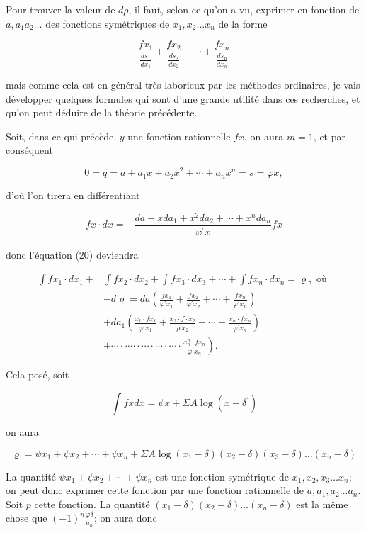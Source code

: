 \documentclass{article}
\begin{document}
Pour trouver la valeur de \(d \rho\), il faut, selon ce qu'on a vu, exprimer en fonction de \(a, a_{1} a_{2} \ldots\) des fonctions symétriques de \(x_{1}, x_{2} \ldots x_{n}\) de la forme

\[
\frac{f x_{1}}{\frac{d s_{1}}{d x_{1}}}+\frac{f x_{2}}{\frac{d s_{2}}{d x_{2}}}+\cdots+\frac{f x_{n}}{\frac{d s_{n}}{d x_{n}}}
\]

mais comme cela est en général très laborieux par les méthodes ordinaires, je vais développer quelques formules qui sont d'une grande utilité dans ces recherches, et qu'on peut déduire de la théorie précédente.

Soit, dans ce qui précède, \(y\) une fonction rationnelle \(f x\), on aura \(m=1\), et par conséquent

\[
0=q=a+a_{1} x+a_{2} x^{2}+\cdots+a_{n} x^{n}=s=\varphi x,
\]

d'où l'on tirera en différentiant

\[
f x \cdot d x=-\frac{d a+x d a_{1}+x^{2} d a_{2}+\cdots+x^{n} d a_{n}}{\varphi^{\prime} x} f x
\]

donc l'équation (20) deviendra

\[
\begin{aligned}
\int f x_{1} \cdot d x_{1}+ & \int f x_{2} \cdot d x_{2}+\int f x_{3} \cdot d x_{3}+\cdots+\int f x_{n} \cdot d x_{n}=\varrho, \text { où } \\
& -d \varrho=d a\left(\frac{f x_{1}}{\varphi^{\prime} x_{1}}+\frac{f x_{2}}{\varphi^{\prime} x_{2}}+\cdots+\frac{f x_{n}}{\varphi^{\prime} x_{n}}\right) \\
& +d a_{1}\left(\frac{x_{1} \cdot f x_{1}}{\varphi^{\prime} x_{1}}+\frac{x_{2} \cdot f \cdot x_{2}}{\rho^{\prime} x_{2}}+\cdots+\frac{x_{n} \cdot f x_{n}}{\varphi^{\prime} x_{n}}\right) \\
& \left.+\cdots \cdot \cdot \cdots \cdot \cdots \cdot \cdots \cdot \cdots \cdot \frac{x_{n}^{n} \cdot f x_{n}}{\varphi^{\prime} x_{n}}\right) .
\end{aligned}
\]

Cela posé, soit

\[
\int f x d x=\psi x+\Sigma A \log \left(x-\delta^{\prime}\right)
\]

on aura

\[
\varrho=\psi x_{1}+\psi x_{2}+\cdots+\psi x_{n}+\Sigma A \log \left(x_{1}-\delta\right)\left(x_{2}-\delta\right)\left(x_{3}-\delta\right) \ldots\left(x_{n}-\delta\right)
\]

La quantité \(\psi x_{1}+\psi x_{2}+\cdots+\psi x_{n}\) est une fonction symétrique de \(x_{1}, x_{2}, x_{3} \ldots x_{n}\); on peut donc exprimer cette fonction par une fonction rationnelle de \(a, a_{1}, a_{2} \ldots a_{n}\). Soit \(p\) cette fonction. La quantité \(\left(x_{1}-\delta\right)\left(x_{2}-\delta\right) \ldots\left(x_{n}-\delta\right)\) est la même chose que \((-1)^{n} \frac{\varphi \delta}{a_{n}}\); on aura donc
\end{document}

